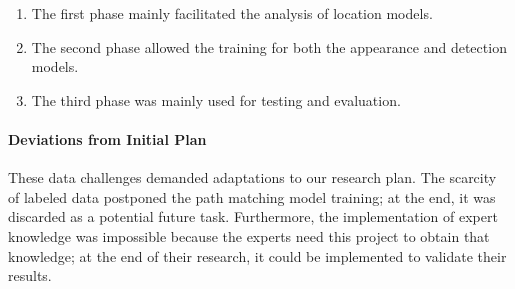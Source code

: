 \begin{enumerate}
    \item The first phase mainly facilitated the analysis of location models.
    \item The second phase allowed the training for both the appearance and detection models.
    \item The third phase was mainly used for testing and evaluation.
\end{enumerate}

\paragraph{Deviations from Initial Plan}

{
    These data challenges demanded adaptations to our research plan. 
    The scarcity of labeled data postponed the path matching model training; 
    at the end, it was discarded as a potential future task. 
    Furthermore, the implementation of expert knowledge was impossible 
    because the experts need this project to obtain that knowledge; 
    at the end of their research, it could be implemented to validate their results.
}


%

